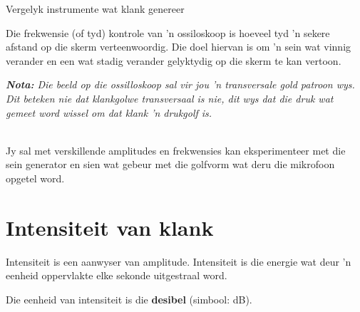 \begin{activity}{Vergelyk instrumente wat klank genereer}
\begin{minipage}{.5\textwidth}
 	
Die frekwensie (of tyd) kontrole van 'n ossiloskoop is hoeveel tyd 'n sekere afstand op die skerm verteenwoordig. Die doel hiervan is om 'n sein wat vinnig verander en een wat stadig verander gelyktydig op die skerm te kan vertoon.\\
\end{minipage}
\begin{minipage}{.5\textwidth}
\begin{center}
\begin{minipage}{.8\textwidth}
\vspace{.5cm}\textsl{\textbf{Nota:} Die beeld op die ossilloskoop sal vir jou 'n transversale gold patroon wys. Dit beteken nie dat klankgolwe transversaal is nie, dit wys dat die druk wat gemeet word wissel om dat klank 'n drukgolf is.}
\end{minipage}
\end{center}
\end{minipage}
\vspace{1em}\\
Jy sal met verskillende amplitudes en frekwensies kan eksperimenteer met die sein generator en sien wat gebeur met die golfvorm wat deru die mikrofoon opgetel word.\\


\end{activity}



\section*{Intensiteit van klank}
\nopagebreak

\par
Intensiteit is een aanwyser van amplitude. Intensiteit is die energie wat deur 'n eenheid oppervlakte elke sekonde uitgestraal word.\par

Die eenheid van intensiteit is die \textbf{desibel} (simbool: dB).

